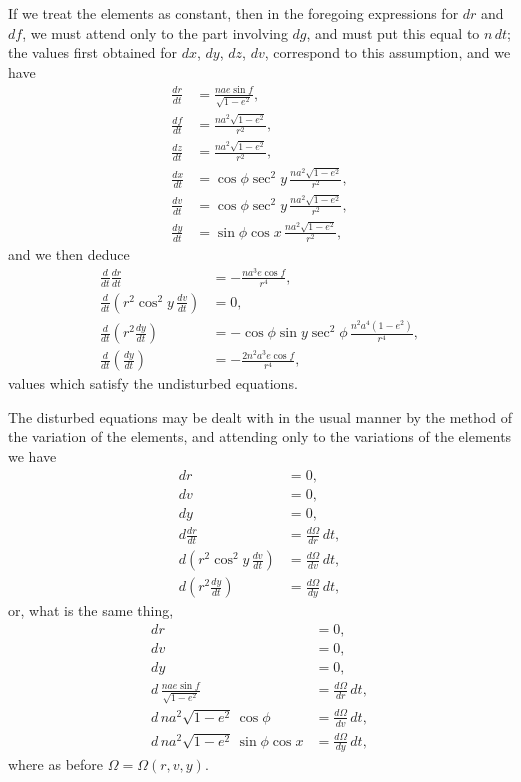 \documentclass[11pt]{article}
\begin{document}
If we treat the elements as constant, then in the foregoing expressions for $dr$ and $df$, we must attend only to the part involving $dg$, and must put this equal to $n\,dt$; the values first obtained for $dx$, $dy$, $dz$, $dv$, correspond to this assumption, and we have
\begin{align*}
\frac{dr}{dt} &= \frac{nae\sin f}{\sqrt{1-e^2}},\\
\frac{df}{dt} &= \frac{na^2\sqrt{1-e^2}}{r^2},\\
\frac{dz}{dt} &= \frac{na^2\sqrt{1-e^2}}{r^2},\\
\frac{dx}{dt} &= \cos\phi \sec^2 y\,\frac{na^2\sqrt{1-e^2}}{r^2},\\
\frac{dv}{dt} &= \cos\phi \sec^2 y\,\frac{na^2\sqrt{1-e^2}}{r^2},\\
\frac{dy}{dt} &= \sin\phi \cos x\,\frac{na^2\sqrt{1-e^2}}{r^2},
\end{align*}
and we then deduce
\begin{align*}
\frac{d}{dt}\frac{dr}{dt} &= -\frac{na^3 e\cos f}{r^4},\\
\frac{d}{dt}\left(r^2\cos^2 y\,\frac{dv}{dt}\right) &= 0,\\
\frac{d}{dt}\left(r^2 \frac{dy}{dt}\right) &= -\cos\phi\sin y\sec^2\phi\,\frac{n^2 a^4(1-e^2)}{r^4},\\
\frac{d}{dt}\left(\frac{dy}{dt}\right) &= -\frac{2n^2 a^3 e\cos f}{r^4},
\end{align*}
values which satisfy the undisturbed equations.

\medskip

The disturbed equations may be dealt with in the usual manner by the method of the variation of the elements, and attending only to the variations of the elements we have
\begin{align*}
dr &= 0,\\
dv &= 0,\\
dy &= 0,\\
d\frac{dr}{dt} &= \frac{d\Omega}{dr}\,dt,\\
d\left(r^2\cos^2 y\,\frac{dv}{dt}\right) &= \frac{d\Omega}{dv}\,dt,\\
d\left(r^2\frac{dy}{dt}\right) &= \frac{d\Omega}{dy}\,dt,
\end{align*}
or, what is the same thing,
\begin{align*}
dr &= 0,\\
dv &= 0,\\
dy &= 0,\\
d\,\frac{nae\sin f}{\sqrt{1-e^2}} &= \frac{d\Omega}{dr}\,dt,\\
d\,na^2\sqrt{1-e^2}\,\cos\phi &= \frac{d\Omega}{dv}\,dt,\\
d\,na^2\sqrt{1-e^2}\,\sin\phi\cos x &= \frac{d\Omega}{dy}\,dt,
\end{align*}
where as before $\Omega = \Omega(r,v,y)$.
\end{document}
